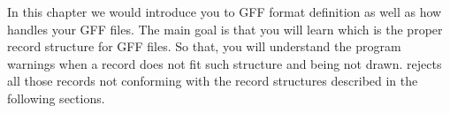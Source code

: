 %
%
%
%


In this chapter we would introduce you to GFF format definition as
well as how {\prog} handles your GFF files. The main goal is that you
will learn which is the proper record structure for GFF files. So
that, you will understand the program warnings when a record does not
fit such structure and being not drawn. {\prog} rejects all those
records not conforming with the record structures described in the
following sections.


		


		


%		
